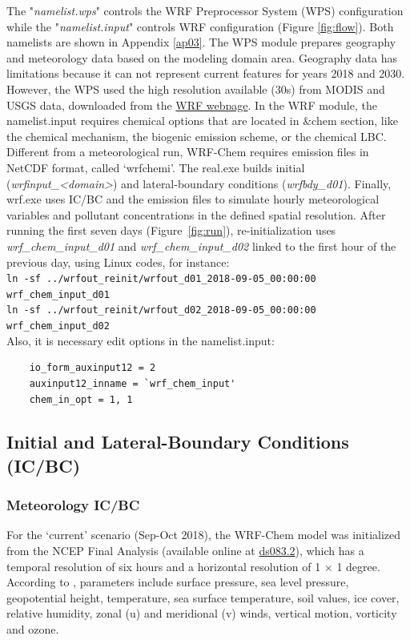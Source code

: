 The "{\it namelist.wps}" controls the WRF Preprocessor System (WPS) configuration while the "{\it namelist.input}" controls WRF configuration (Figure \ref{fig:flow}).
Both namelists are shown in Appendix \ref{ap03}.
The WPS module prepares geography and meteorology data based on the modeling domain area.
Geography data has limitations because it can not represent current features for years 2018 and 2030.
However, the WPS used the high resolution available (30s) from MODIS and USGS data, downloaded from the \href{https://www2.mmm.ucar.edu/wrf/users/download/get_sources_wps_geog.html}{WRF webpage}.
In the WRF module, the namelist.input requires chemical options that are located in \&chem section, like the chemical mechanism, the biogenic emission scheme, or the chemical LBC. 
Different from a meteorological run, WRF-Chem requires emission files in NetCDF format, called `wrfchemi'.
The real.exe builds initial ({\it wrfinput\_<domain>}) and lateral-boundary conditions ({\it wrfbdy\_d01}).
Finally, wrf.exe uses IC/BC and the emission files to simulate hourly meteorological variables and pollutant concentrations in the defined spatial resolution.
 After running the first seven days (Figure~\ref{fig:run}), re-initialization uses {\it wrf\_chem\_input\_d01} and {\it wrf\_chem\_input\_d02} linked to the first hour of the previous day, using Linux codes, for instance:
  \\ \verb|ln -sf ../wrfout_reinit/wrfout_d01_2018-09-05_00:00:00 wrf_chem_input_d01|\\
  \verb|ln -sf ../wrfout_reinit/wrfout_d02_2018-09-05_00:00:00 wrf_chem_input_d02|\\
 Also, it is necessary edit options in the namelist.input:
 \begin{verbatim}
 	io_form_auxinput12 = 2
 	auxinput12_inname = `wrf_chem_input'
 	chem_in_opt = 1, 1
 \end{verbatim}
	
	
	\subsection{Initial and Lateral-Boundary Conditions (IC/BC)}
	
		\subsubsection{Meteorology IC/BC}
		For the `current' scenario (Sep-Oct 2018), the WRF-Chem model was initialized from the NCEP Final Analysis (available online at \href{https://rda.ucar.edu/datasets/ds083.2/}{ds083.2}), which has a temporal resolution of six hours and a horizontal resolution of 1 $\times$ 1 degree.
		According to \cite{NCEP2000}, parameters include surface pressure, sea level pressure, geopotential height, temperature, sea surface temperature, soil values, ice cover, relative humidity, zonal (u) and meridional (v) winds, vertical motion, vorticity and ozone.
		
